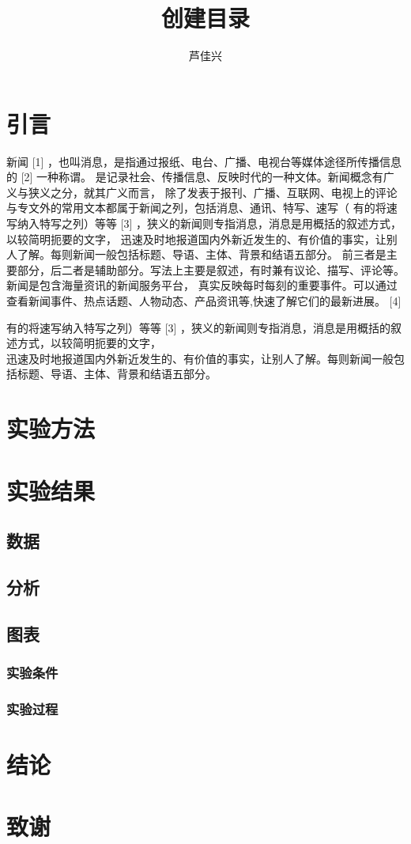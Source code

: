 \documentclass{article}
\begin{document}
\title{创建目录}
\author{芦佳兴}
\tableofcontents
\maketitle
    \section{引言}
    新闻 [1]  ，也叫消息，是指通过报纸、电台、广播、电视台等媒体途径所传播信息的 [2]  一种称谓。
    是记录社会、传播信息、反映时代的一种文体。新闻概念有广义与狭义之分，就其广义而言，
    除了发表于报刊、广播、互联网、电视上的评论与专文外的常用文本都属于新闻之列，包括消息、通讯、特写、速写（
    有的将速写纳入特写之列）等等 [3]  ，狭义的新闻则专指消息，消息是用概括的叙述方式，以较简明扼要的文字，
    迅速及时地报道国内外新近发生的、有价值的事实，让别人了解。每则新闻一般包括标题、导语、主体、背景和结语五部分。
    前三者是主要部分，后二者是辅助部分。写法上主要是叙述，有时兼有议论、描写、评论等。新闻是包含海量资讯的新闻服务平台，
    真实反映每时每刻的重要事件。可以通过查看新闻事件、热点话题、人物动态、产品资讯等,快速了解它们的最新进展。 [4]

    有的将速写纳入特写之列）等等 [3]  ，狭义的新闻则专指消息，消息是用概括的叙述方式，以较简明扼要的文字，
    \\迅速及时地报道国内外新近发生的、有价值的事实，让别人了解。每则新闻一般包括标题、导语、主体、背景和结语五部分。
  

    \section{实验方法}
    \section{实验结果}
    \subsection{数据}
    \subsection{分析}
    \subsection{图表}
    \subsubsection{实验条件}
    \subsubsection{实验过程}
    \section{结论}
    \section{致谢}
\end{document}
